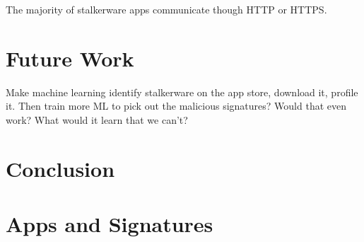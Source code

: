 \documentclass[acmtog]{acmart}
\begin{document}
The majority of stalkerware apps communicate though HTTP or HTTPS.

\section{Future Work}

Make machine learning identify stalkerware on the app store, download it, 
profile it. Then train more ML to pick out the malicious signatures? Would that 
even work? What would it learn that we can't?

\section{Conclusion}




\appendix

\section{Apps and Signatures}
\end{document}
